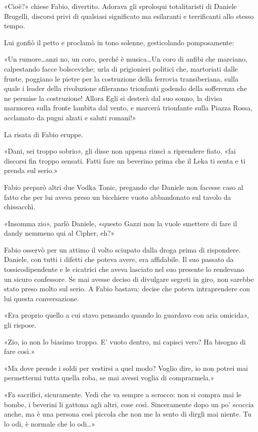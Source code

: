 «Cioè?» chiese Fabio, divertito. Adorava gli sproloqui totalitaristi di Daniele Brogelli, discorsi privi di qualsiasi significato ma esilaranti e terrificanti allo stesso tempo.

Lui gonfiò il petto e proclamò in tono solenne, gesticolando pomposamente:

«Un rumore\ldots anzi no, un coro, perché è musica\ldots Un coro di anfibi che marciano, calpestando facce bolsceviche; urla di prigionieri politici che, martoriati dalle fruste, poggiano le pietre per la costruzione della ferrovia transiberiana, sulla quale i leader della rivoluzione sfileranno trionfanti godendo della sofferenza che ne permise la costruzione! Allora Egli si desterà dal suo sonno, la divisa marmorea sulla fronte lambita dal vento, e marcerà trionfante sulla Piazza Rossa, acclamato da pugni alzati e saluti romani!»

La risata di Fabio eruppe.

«Dani, sei troppo sobrio», gli disse non appena riuscì a riprendere fiato, «fai discorsi fin troppo sensati. Fatti fare un beverino prima che il Leka ti senta e ti prenda sul serio.»

Fabio preparò altri due Vodka Tonic, pregando che Daniele non facesse caso al fatto che per lui aveva preso un bicchiere vuoto abbandonato sul tavolo da chissacchì.

«Insomma zio», parlò Daniele, «questo Gazzi non la vuole smettere di fare il dandy nemmeno qui al Cipher, eh?»

Fabio osservò per un attimo il volto sciupato dalla droga prima di rispondere. Daniele, con tutti i difetti che poteva avere, era affidabile. Il suo passato da tossicodipendente e le cicatrici che aveva lasciato nel suo presente lo rendevano un sicuro confessore. Se mai avesse deciso di divulgare segreti in giro, non sarebbe stato preso molto sul serio. A Fabio bastava: decise che poteva intraprendere con lui questa conversazione.

«Era proprio quello a cui stavo pensando quando lo guardavo con aria omicida», gli rispose.

«Zio, io non lo biasimo troppo. E' vuoto dentro, mi capisci vero? Ha bisogno di fare così.»

«Ma dove prende i soldi per vestirsi a quel modo? Voglio dire, io non potrei mai permettermi tutta quella roba, se mai avessi voglia di comprarmela.»

«Fa sacrifici, sicuramente. Vedi che va sempre a scrocco: non si compra mai le bombe, i beverini li gattona agli altri, cose così. Sinceramente dopo un po' scoccia anche, ma è una persona così piccola che non me la sento di dirgli mai niente. Tu lo odi, è normale che lo odi\ldots»

